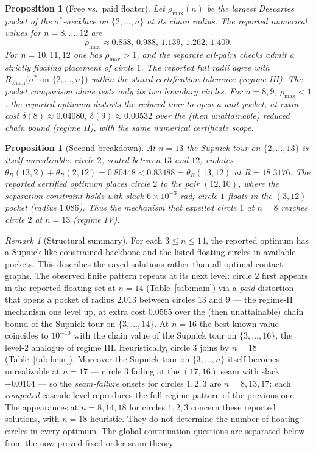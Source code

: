 \documentclass[11pt]{article}
\newtheorem{proposition}[theorem]{Proposition}
\theoremstyle{definition}
\theoremstyle{remark}
\newtheorem{remark}[theorem]{Remark}
\begin{document}
\begin{proposition}[Free vs.\ paid floater]\label{prop:break2}
Let $\rho_{\max}(n)$ be the largest Descartes pocket of the $\sigma^\ast$-necklace on $\{2,\dots,n\}$ at its chain radius. The reported numerical values for $n=8,\dots,12$ are
\[
\rho_{\max}\approx0.858,\,0.988,\,1.139,\,1.262,\,1.409.
\]
For $n=10,11,12$ one has $\rho_{\max}>1$, and the separate all-pairs checks admit a strictly floating placement of circle $1$. The reported full radii agree with
$R_{\mathrm{chain}}\big(\sigma^\ast\text{ on }\{2,\dots,n\}\big)$ within the stated certification tolerance (regime III). The pocket comparison alone tests only its two boundary circles.
For $n=8,9$, $\rho_{\max}<1$: the reported optimum distorts the reduced tour to open a unit pocket, at extra cost $\delta(8)\approx0.04080$, $\delta(9)\approx0.00532$ over the (then unattainable) reduced chain bound (regime II), with the same numerical certificate scope.
\end{proposition}

\begin{proposition}[Second breakdown]\label{prop:break3}
At $n=13$ the Supnick tour on $\{2,\dots,13\}$ is itself unrealizable: circle $2$, seated between $13$ and $12$, violates
$\theta_R(13,2)+\theta_R(2,12)=0.80448<0.83488=\theta_R(13,12)$ at $R=18.3176$.
The reported certified optimum places circle $2$ to the pair $(12,10)$, where the separation constraint holds with slack $6\times10^{-3}$ rad; circle $1$ floats in the $(3,12)$ pocket (radius $1.086$). Thus the mechanism that expelled circle $1$ at $n=8$ reaches circle $2$ at $n=13$ (regime IV).
\end{proposition}

\begin{remark}[Structural summary]
For each $3\le n\le14$, the reported optimum has a Supnick-like constrained backbone and the listed floating circles in available pockets. This describes the saved solutions rather than all optimal contact graphs. The observed finite pattern repeats at its next level: circle $2$ first appears in the reported floating set at $n=14$ (Table~\ref{tab:main}) via a \emph{paid} distortion that opens a pocket of radius $2.013$ between circles $13$ and $9$ --- the regime-II mechanism one level up, at extra cost $0.0565$ over the (then unattainable) chain bound of the Supnick tour on $\{3,\dots,14\}$. At $n=16$ the best known value coincides to $10^{-10}$ with the chain value of the Supnick tour on $\{3,\dots,16\}$, the level-2 analogue of regime III. Heuristically, circle $3$ joins by $n=18$ (Table~\ref{tab:heur}). Moreover the Supnick tour on $\{3,\dots,n\}$ itself becomes unrealizable at $n=17$ --- circle $3$ failing at the $(17,16)$ seam with slack $-0.0104$ --- so the \emph{seam-failure} onsets for circles $1,2,3$ are $n=8,13,17$: each \emph{computed} cascade level reproduces the full regime pattern of the previous one. The appearances at $n=8,14,18$ for circles $1,2,3$ concern these reported solutions, with $n=18$ heuristic. They do not determine the number of floating circles in every optimum. The global continuation questions are separated below from the now-proved fixed-order seam theory.
\end{remark}
\end{document}

